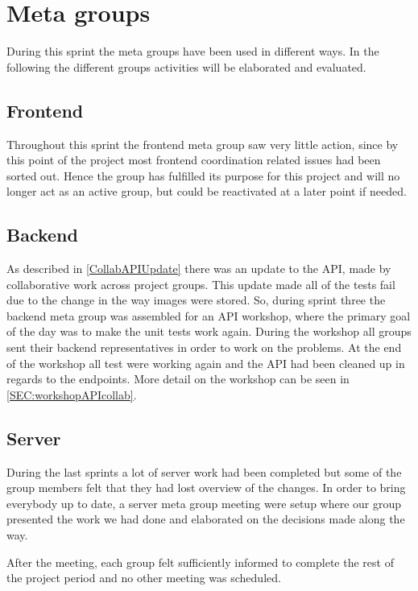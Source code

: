 \section{Meta groups}
During this sprint the meta groups have been used in different ways.
In the following the different groups activities will be elaborated and evaluated.

\subsection{Frontend}
Throughout this sprint the frontend meta group saw very little action, since by this point of the project most frontend coordination related issues had been sorted out.
Hence the group has fulfilled its purpose for this project and will no longer act as an active group, but could be reactivated at a later point if needed.

\subsection{Backend}
As described in \autoref{CollabAPIUpdate} there was an update to the API, made by collaborative work across project groups.
This update made all of the tests fail due to the change in the way images were stored.
So, during sprint three the backend meta group was assembled for an API workshop, where the primary goal of the day was to make the unit tests work again.
During the workshop all groups sent their backend representatives in order to work on the problems.
At the end of the workshop all test were working again and the API had been cleaned up in regards to the endpoints.
More detail on the workshop can be seen in \autoref{SEC:workshopAPIcollab}.

\subsection{Server}
During the last sprints a lot of server work had been completed but some of the group members felt that they had lost overview of the changes.
In order to bring everybody up to date, a server meta group meeting were setup where our group presented the work we had done and elaborated on the decisions made along the way.

After the meeting, each group felt sufficiently informed to complete the rest of the project period and no other meeting was scheduled.

